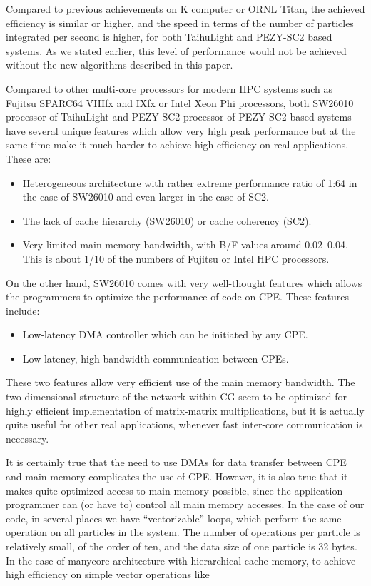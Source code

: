 \documentclass[Afour,sageh,times]{sagej}
\begin{document}
Compared to previous achievements on K computer or ORNL Titan, the
achieved efficiency is similar or higher, and the speed in terms of
the number of particles integrated per second is higher, for both
TaihuLight and PEZY-SC2 based systems. As we stated earlier, this
level of performance would not be achieved without the new algorithms
described in this paper.

Compared to other multi-core processors for modern HPC systems such as
Fujitsu SPARC64 VIIIfx and IXfx or Intel Xeon Phi processors, both
SW26010 processor of TaihuLight and PEZY-SC2 processor of PEZY-SC2
based systems have several unique features which allow very high peak
performance but at the same time make it much harder to achieve high
efficiency on real applications. These are:

\begin{itemize}

  \item Heterogeneous architecture with rather extreme performance
    ratio of 1:64 in the case of SW26010 and even larger in the case
    of SC2.
  \item The lack of cache hierarchy (SW26010) or cache coherency (SC2).
  \item Very limited main memory bandwidth, with B/F values around
    0.02--0.04.  This is about 1/10 of the numbers of Fujitsu or Intel HPC processors.
    
\end{itemize}  

On the other hand, SW26010 comes with very well-thought features which
allows the programmers to optimize the performance of code on
CPE. These features include:
\begin{itemize}

\item Low-latency DMA controller which can be initiated by any CPE.
\item Low-latency, high-bandwidth communication between CPEs.
  
\end{itemize}  

These two features allow very efficient use of the main memory
bandwidth. The two-dimensional structure of the network within CG seem
to be optimized for highly efficient implementation of matrix-matrix
multiplications, but it is actually quite useful for other real
applications, whenever fast inter-core communication is necessary.

It is certainly true that the need to use DMAs for data transfer
between CPE and main memory complicates the use of CPE. However, it is
also true that it makes quite optimized access to main memory
possible, since the application programmer can (or have to) control
all main memory accesses. In the case of our code, in several places
we have ``vectorizable'' loops, which perform the same operation on
all particles in the system. The number of operations per particle is
relatively small, of the order of ten, and the data size of one
particle is 32 bytes. In the case of manycore architecture with
hierarchical cache memory, to achieve high efficiency on simple vector
operations like
\end{document}
